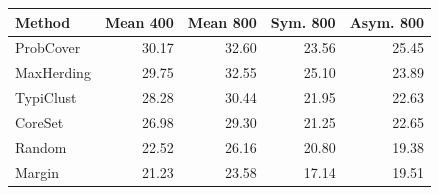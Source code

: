 \begin{tabular}{lrrrr}
\toprule
Method & Mean 400 & Mean 800 & Sym. 800 & Asym. 800 \\
\midrule
ProbCover & 30.17 & 32.60 & 23.56 & 25.45 \\
MaxHerding & 29.75 & 32.55 & 25.10 & 23.89 \\
TypiClust & 28.28 & 30.44 & 21.95 & 22.63 \\
CoreSet & 26.98 & 29.30 & 21.25 & 22.65 \\
Random & 22.52 & 26.16 & 20.80 & 19.38 \\
Margin & 21.23 & 23.58 & 17.14 & 19.51 \\
\bottomrule
\end{tabular}
